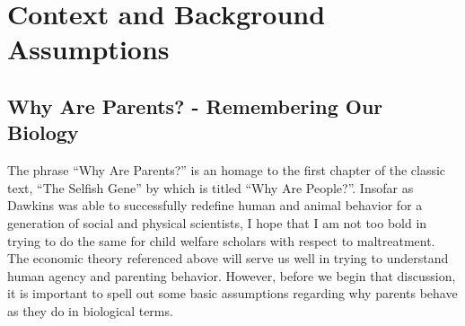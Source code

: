 \documentclass[1p, review]{elsarticle}\usepackage[]{graphicx}\usepackage[]{color}
\begin{document}
% 
% 
% 

\section{Context and Background Assumptions}
\label{sec:context}

\subsection{Why Are Parents? - Remembering Our Biology}
The phrase ``Why Are Parents?'' is an homage to the first chapter of the classic text, ``The Selfish Gene'' by \citet{Dawkins1976} which is titled ``Why Are People?''. Insofar as Dawkins was able to successfully redefine human and animal behavior for a generation of social and physical scientists, I hope that I am not too bold in trying to do the same for child welfare scholars with respect to maltreatment. The economic theory referenced above will serve us well in trying to understand human agency and parenting behavior. However, before we begin that discussion, it is important to spell out some basic assumptions regarding why parents behave as they do in biological terms. 
\end{document}
